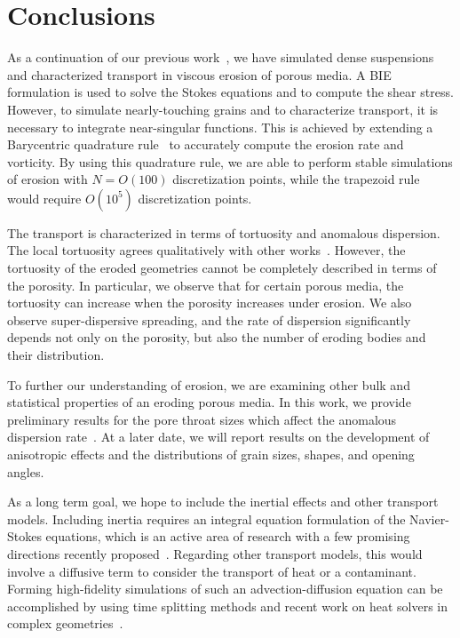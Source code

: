 \documentclass{jfm}
\begin{document}
\section{Conclusions}
\label{sec:conclusions}
As a continuation of our previous work~\citep{qua-moo2018}, we have
simulated dense suspensions and characterized transport in viscous
erosion of porous media. A BIE formulation is used to solve the Stokes
equations and to compute the shear stress. However, to simulate
nearly-touching grains and to characterize transport, it is necessary to
integrate near-singular functions. This is achieved by extending a
Barycentric quadrature rule~\citep{bar-wu-vee2015} to accurately compute
the erosion rate and vorticity. By using this quadrature rule, we are
able to perform stable simulations of erosion with $N = O(100)$
discretization points, while the trapezoid rule would require $O(10^5)$
discretization points.

The transport is characterized in terms of tortuosity and anomalous
dispersion. The local tortuosity agrees qualitatively with other
works~\citep{mat-kha-koz2008}. However, the tortuosity of the eroded
geometries cannot be completely described in terms of the porosity. In
particular, we observe that for certain porous media, the tortuosity can
increase when the porosity increases under erosion. We also observe
super-dispersive spreading, and the rate of dispersion significantly
depends not only on the porosity, but also the number of eroding bodies
and their distribution.

To further our understanding of erosion, we are examining other bulk and
statistical properties of an eroding porous media. In this work, we
provide preliminary results for the pore throat sizes which affect the
anomalous dispersion rate~\citep{dea-qua-bir-jua2018}.  At a later date,
we will report results on the  development of anisotropic effects and
the distributions of grain sizes, shapes, and opening angles.

As a long term goal, we hope to include the inertial effects and other
transport models. Including inertia requires an integral equation
formulation of the Navier-Stokes equations, which is an active area of
research with a few promising directions recently
proposed~\citep{gray2019boundary, kli-ask-kro2019}.  Regarding other
transport models, this would involve a diffusive term to consider the
transport of heat or a contaminant. Forming high-fidelity simulations of
such an advection-diffusion equation can be accomplished by using time
splitting methods and recent work on heat solvers in complex
geometries~\citep{fry-kro-tor2019}.
\end{document}
